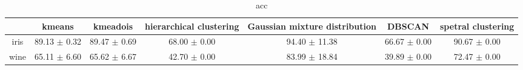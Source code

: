 \begin{table}
\centering
\begin{tabular}{ccccccc}
\toprule
 & kmeans & kmeadois & hierarchical clustering & Gaussian mixture distribution & DBSCAN & spetral clustering \\
\midrule
iris & 89.13 $\pm$ 0.32 & 89.47 $\pm$ 0.69 & 68.00 $\pm$ 0.00 & 94.40 $\pm$ 11.38 & 66.67 $\pm$ 0.00 & 90.67 $\pm$ 0.00 \\
wine & 65.11 $\pm$ 6.60 & 65.62 $\pm$ 6.67 & 42.70 $\pm$ 0.00 & 83.99 $\pm$ 18.84 & 39.89 $\pm$ 0.00 & 72.47 $\pm$ 0.00 \\
\bottomrule
\end{tabular}
\caption{acc}
\label{table:acc}
\end{table}
